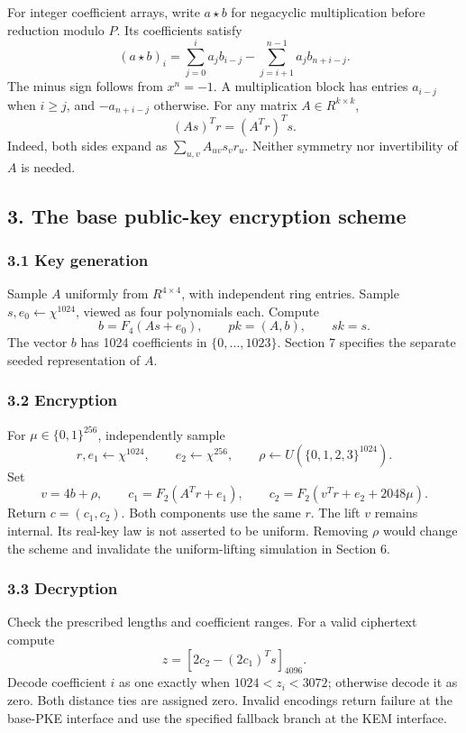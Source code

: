\documentclass[
  10pt,
  a4paper,
]{article}
\begin{document}
For integer coefficient arrays, write \(a\star b\) for negacyclic
multiplication before reduction modulo \(P\). Its coefficients satisfy
\[
(a\star b)_i=\sum_{j=0}^{i}a_jb_{i-j}
-\sum_{j=i+1}^{n-1}a_jb_{n+i-j}.
\] The minus sign follows from \(x^n=-1\). A multiplication block has
entries \(a_{i-j}\) when \(i\ge j\), and \(-a_{n+i-j}\) otherwise. For
any matrix \(A\in R^{k\times k}\), \[
(As)^Tr=(A^Tr)^Ts.
\] Indeed, both sides expand as \(\sum_{u,v}A_{uv}s_vr_u\). Neither
symmetry nor invertibility of \(A\) is needed.

\subsection{3. The base public-key encryption
scheme}\label{the-base-public-key-encryption-scheme}

\subsubsection{3.1 Key generation}\label{key-generation}

Sample \(A\) uniformly from \(R^{4\times4}\), with independent ring
entries. Sample \(s,e_0\leftarrow\chi^{1024}\), viewed as four
polynomials each. Compute \[
b=F_4(As+e_0),\qquad pk=(A,b),\qquad sk=s.
\] The vector \(b\) has 1024 coefficients in \(\{0,\ldots,1023\}\).
Section 7 specifies the separate seeded representation of \(A\).

\subsubsection{3.2 Encryption}\label{encryption}

For \(\mu\in\{0,1\}^{256}\), independently sample \[
r,e_1\leftarrow\chi^{1024},\qquad e_2\leftarrow\chi^{256},\qquad
\rho\leftarrow U(\{0,1,2,3\}^{1024}).
\] Set \[
v=4b+\rho,\qquad
c_1=F_2(A^Tr+e_1),\qquad
c_2=F_2(v^Tr+e_2+2048\mu).
\] Return \(c=(c_1,c_2)\). Both components use the same \(r\). The lift
\(v\) remains internal. Its real-key law is not asserted to be uniform.
Removing \(\rho\) would change the scheme and invalidate the
uniform-lifting simulation in Section 6.

\subsubsection{3.3 Decryption}\label{decryption}

Check the prescribed lengths and coefficient ranges. For a valid
ciphertext compute \[
z=[2c_2-(2c_1)^Ts]_{4096}.
\] Decode coefficient \(i\) as one exactly when \(1024<z_i<3072\);
otherwise decode it as zero. Both distance ties are assigned zero.
Invalid encodings return failure at the base-PKE interface and use the
specified fallback branch at the KEM interface.
\end{document}
